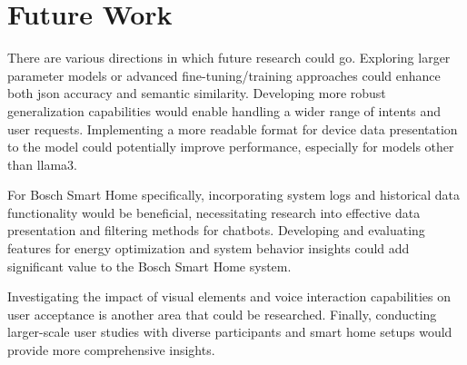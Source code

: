 \section{Future Work}

There are various directions in which future research could go.
Exploring larger parameter models or advanced fine-tuning/training approaches could enhance both \gls{json} accuracy and semantic similarity. 
Developing more robust generalization capabilities would enable handling a wider range of intents and user requests.
Implementing a more readable format for device data presentation to the model could potentially improve performance, especially for models other than llama3. 

For Bosch Smart Home specifically, incorporating system logs and historical data functionality would be beneficial, necessitating research into effective data presentation and filtering methods for chatbots.
Developing and evaluating features for energy optimization and system behavior insights could add significant value to the Bosch Smart Home system.

Investigating the impact of visual elements and voice interaction capabilities on user acceptance is another area that could be researched. 
Finally, conducting larger-scale user studies with diverse participants and smart home setups would provide more comprehensive insights. 